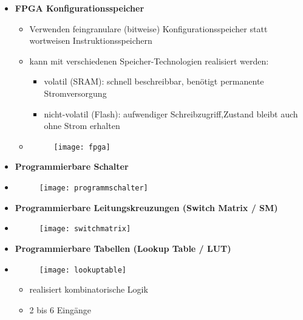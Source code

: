 \begin{itemize}
\item \textbf{FPGA Konfigurationsspeicher}
	\begin{itemize}
	\item Verwenden feingranulare (bitweise) Konfigurationsspeicher statt wortweisen Instruktionsspeichern
	\item kann mit verschiedenen Speicher-Technologien realisiert werden:
		\begin{itemize}
		\item volatil (SRAM): schnell beschreibbar, benötigt permanente Stromversorgung
		\item nicht-volatil (Flash): aufwendiger Schreibzugriff,Zustand bleibt auch ohne Strom erhalten
		\end{itemize}
	\item[]
			\begin{figure}[H]
			\begin{center}
			\texttt{[image: fpga]}
			\end{center}
			\end{figure}
	\end{itemize}

\item \textbf{Programmierbare Schalter}
\item[]
			\begin{figure}[H]
			\begin{center}
			\texttt{[image: programmschalter]}
			\end{center}
			\end{figure}

\pagebreak

\item \textbf{Programmierbare Leitungskreuzungen (Switch Matrix / SM)}
\item[]
			\begin{figure}[H]
			\begin{center}
			\texttt{[image: switchmatrix]}
			\end{center}
			\end{figure}
			
\item \textbf{Programmierbare Tabellen (Lookup Table / LUT)}
\item[]
		\begin{minipage}{0.3\textwidth}
				\begin{figure}[H]
				\texttt{[image: lookuptable]}
				\end{figure}
			\end{minipage}
			\begin{minipage}[t]{0.5\textwidth}
				\vspace{-1.25cm}
				\begin{itemize}
				\item realisiert kombinatorische Logik
				\item 2 bis 6 Eingänge
				\end{itemize}
			\end{minipage}
			

\end{itemize}
